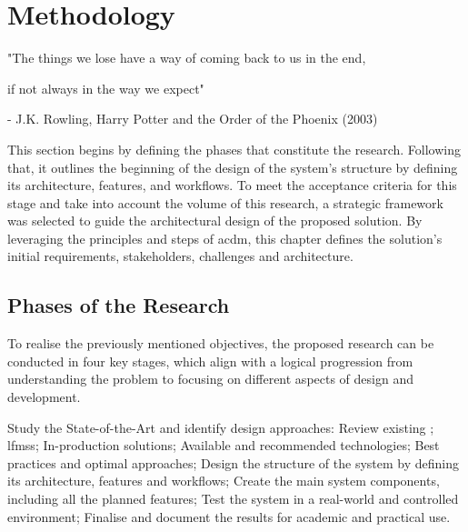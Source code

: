 \chapter{Methodology}
\label{chapter:methodology}

\begin{introduction}
"The things we lose have a way of coming back to us in the end,

if not always in the way we expect"

- J.K. Rowling, Harry Potter and the Order of the Phoenix (2003)
\end{introduction}

This section begins by defining the phases that constitute the research. Following that, it outlines the beginning of the design of the system's structure by defining its architecture, features, and workflows. To meet the acceptance criteria for this stage and take into account the volume of this research, a strategic framework was selected to guide the architectural design of the proposed solution. By leveraging the principles and steps of \ac{acdm}, this chapter defines the solution's initial requirements, stakeholders, challenges and architecture.


\section{Phases of the Research} \label{section:phases_of_the_research}

To realise the previously mentioned objectives, the proposed research can be conducted in four key stages, which align with a logical progression from understanding the problem to focusing on different aspects of design and development.

\begin{outline}[enumerate]
    \1 Study the State-of-the-Art and identify design approaches:
        \2 Review existing ;
        \2 \aclp{lfms};
        \2 In-production solutions;
        \2 Available and recommended technologies;
        \2 Best practices and optimal approaches;
    \1 Design the structure of the system by defining its architecture, features and workflows;
    \1 Create the main system components, including all the planned features;
    \1 Test the system in a real-world and controlled environment;
    \1 Finalise and document the results for academic and practical use.
\end{outline}

